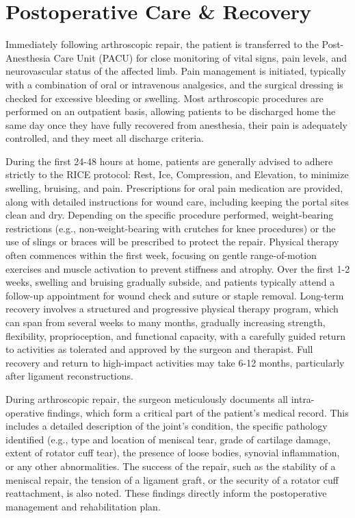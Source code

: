 \section*{Postoperative Care \& Recovery}
Immediately following arthroscopic repair, the patient is transferred to the Post-Anesthesia Care Unit (PACU) for close monitoring of vital signs, pain levels, and neurovascular status of the affected limb. Pain management is initiated, typically with a combination of oral or intravenous analgesics, and the surgical dressing is checked for excessive bleeding or swelling. Most arthroscopic procedures are performed on an outpatient basis, allowing patients to be discharged home the same day once they have fully recovered from anesthesia, their pain is adequately controlled, and they meet all discharge criteria.

During the first 24-48 hours at home, patients are generally advised to adhere strictly to the RICE protocol: Rest, Ice, Compression, and Elevation, to minimize swelling, bruising, and pain. Prescriptions for oral pain medication are provided, along with detailed instructions for wound care, including keeping the portal sites clean and dry. Depending on the specific procedure performed, weight-bearing restrictions (e.g., non-weight-bearing with crutches for knee procedures) or the use of slings or braces will be prescribed to protect the repair. Physical therapy often commences within the first week, focusing on gentle range-of-motion exercises and muscle activation to prevent stiffness and atrophy. Over the first 1-2 weeks, swelling and bruising gradually subside, and patients typically attend a follow-up appointment for wound check and suture or staple removal. Long-term recovery involves a structured and progressive physical therapy program, which can span from several weeks to many months, gradually increasing strength, flexibility, proprioception, and functional capacity, with a carefully guided return to activities as tolerated and approved by the surgeon and therapist. Full recovery and return to high-impact activities may take 6-12 months, particularly after ligament reconstructions.

During arthroscopic repair, the surgeon meticulously documents all intra-operative findings, which form a critical part of the patient's medical record. This includes a detailed description of the joint's condition, the specific pathology identified (e.g., type and location of meniscal tear, grade of cartilage damage, extent of rotator cuff tear), the presence of loose bodies, synovial inflammation, or any other abnormalities. The success of the repair, such as the stability of a meniscal repair, the tension of a ligament graft, or the security of a rotator cuff reattachment, is also noted. These findings directly inform the postoperative management and rehabilitation plan.

